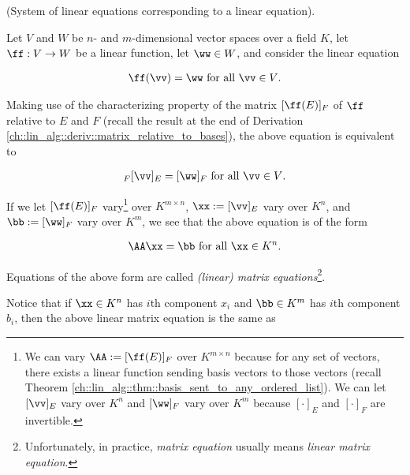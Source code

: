\begin{deriv}
    (System of linear equations corresponding to a linear equation).
    
    Let $V$ and $W$ be $n$- and $m$-dimensional vector spaces over a field $K$, let $\ff:V \rightarrow W$ be a linear function, let $\ww \in W$, and consider the linear equation

    \begin{align*}
        \ff(\vv) = \ww \text{ for all $\vv \in V$}.
    \end{align*}

    Making use of the characterizing property of the matrix $[\ff(E)]_F$ of $\ff$ relative to $E$ and $F$ (recall the result at the end of Derivation \ref{ch::lin_alg::deriv::matrix_relative_to_bases}), the above equation is equivalent to

    \begin{align*}
       [\ff(E)]_F [\vv]_E = [\ww]_F \text{ for all $\vv \in V$}.
    \end{align*}

    If we let $[\ff(E)]_F$ vary\footnote{We can vary $\AA := [\ff(E)]_F$ over $K^{m \times n}$ because for any set of vectors, there exists a linear function sending basis vectors to those vectors (recall Theorem \ref{ch::lin_alg::thm::basis_sent_to_any_ordered_list}). We can let $[\vv]_E$ vary over $K^n$ and $[\ww]_F$ vary over $K^m$ because $[\cdot]_E$ and $[\cdot]_F$ are invertible.} over $K^{m \times n}$, $\xx := [\vv]_E$ vary over $K^n$, and $\bb:= [\ww]_F$ vary over $K^m$, we see that the above equation is of the form

    \begin{align*}
        \AA \xx = \bb \text{ for all $\xx \in K^n$}.
    \end{align*}
    
    Equations of the above form are called \textit{(linear) matrix equations}\footnote{Unfortunately, in practice, \textit{matrix equation} usually means \textit{linear matrix equation}.}.
    
    Notice that if $\xx \in K^n$ has $i$th component $x_i$ and $\bb \in K^m$ has $i$th component $b_i$, then the above linear matrix equation is the same as


\end{deriv}
